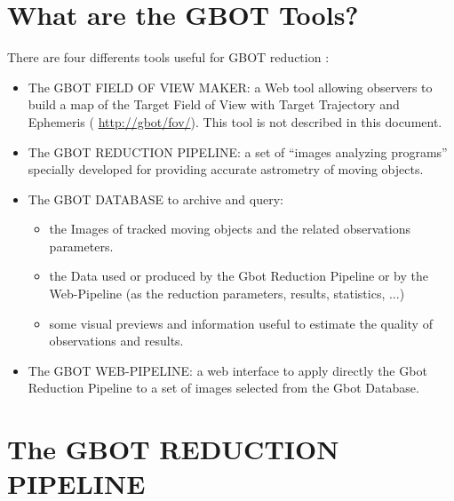 \section{What are the GBOT Tools?}
There are four differents tools useful for GBOT reduction : 
\begin{itemize}
\item The GBOT FIELD OF VIEW MAKER: a Web tool allowing observers to build a map of the Target Field of View with Target Trajectory and Ephemeris ( \url{http://gbot/fov/}). This tool is not described in this document.
\item The GBOT REDUCTION PIPELINE: a set of “images analyzing programs” specially developed for providing accurate astrometry of moving objects. 
\item The GBOT DATABASE to archive and query:
                \begin{itemize}
                \item the Images of tracked moving objects and the related observations parameters. 
                \item the Data used or produced by the Gbot Reduction Pipeline or by the Web-Pipeline (as the reduction parameters, results, statistics, ...)
                \item some visual previews and information useful to estimate the quality of observations and results.
                \end{itemize}  
\item The GBOT WEB-PIPELINE: a web interface to apply directly the Gbot Reduction Pipeline to a set of images selected from the Gbot Database.                                    
\end{itemize}


\section{The GBOT REDUCTION PIPELINE }

